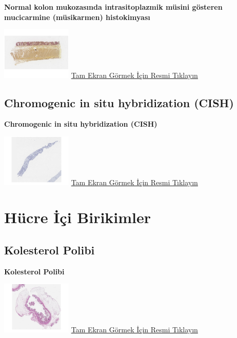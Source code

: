 \documentclass[
  letterpaper,
  DIV=11,
  numbers=noendperiod]{scrreprt}
\begin{document}
\textbf{Normal kolon mukozasında intrasitoplazmik müsini gösteren
mucicarmine (müsikarmen) histokimyası}

\href{https://images.patolojiatlasi.com/mucin/mucicarmine.html}{\includegraphics[width=0.25\textwidth,height=\textheight]{./screenshots/mucicarmine_screenshot.png}}
\href{https://images.patolojiatlasi.com/mucin/mucicarmine.html}{Tam
Ekran Görmek İçin Resmi Tıklayın}

\hypertarget{sec-chromogenic-in-situ-hybridization-cish}{%
\section{Chromogenic in situ hybridization
(CISH)}\label{sec-chromogenic-in-situ-hybridization-cish}}

\textbf{Chromogenic in situ hybridization (CISH)}

\href{https://images.patolojiatlasi.com/her2-cish/cish.html}{\includegraphics[width=0.25\textwidth,height=\textheight]{./screenshots/cish_screenshot.png}}
\href{https://images.patolojiatlasi.com/her2-cish/cish.html}{Tam Ekran
Görmek İçin Resmi Tıklayın}

\hypertarget{sec-hucre-ici-birikimler}{%
\chapter{Hücre İçi Birikimler}\label{sec-hucre-ici-birikimler}}

\hypertarget{sec-kolesterol-polibi}{%
\section{Kolesterol Polibi}\label{sec-kolesterol-polibi}}

\textbf{Kolesterol Polibi}

\href{https://images.patolojiatlasi.com/cholesterolpolyp/HE.html}{\includegraphics[width=0.25\textwidth,height=\textheight]{./screenshots/cholesterolpolyp_screenshot.png}}
\href{https://images.patolojiatlasi.com/cholesterolpolyp/HE.html}{Tam
Ekran Görmek İçin Resmi Tıklayın}
\end{document}
